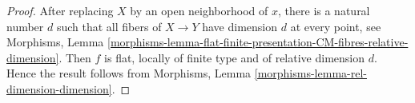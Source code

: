 \documentclass[10pt,a4paper]{amsart}
\theoremstyle{plain}
\theoremstyle{definition}
\theoremstyle{remark}
\numberwithin{equation}{subsection}
\begin{document}
\begin{proof}
After replacing $X$ by an open neighborhood of $x$,
there is a natural number $d$ such that all fibers
of $X \to Y$ have dimension $d$ at every point, see
Morphisms, Lemma
\ref{morphisms-lemma-flat-finite-presentation-CM-fibres-relative-dimension}.
Then $f$ is flat, locally of finite type
and of relative dimension $d$. Hence the result follows from
Morphisms, Lemma \ref{morphisms-lemma-rel-dimension-dimension}.
\end{proof}
\end{document}
